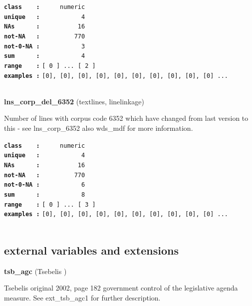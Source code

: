 \documentclass[]{article}
\begin{document}
\textbf{\texttt{class\ \ \ \ :}} \texttt{~~~~~numeric}\\
\textbf{\texttt{unique\ \ \ :}} \texttt{~~~~~~~~~~~4}\\
\textbf{\texttt{NAs\ \ \ \ \ \ :}} \texttt{~~~~~~~~~~16}\\
\textbf{\texttt{not-NA\ \ \ :}} \texttt{~~~~~~~~~770}\\
\textbf{\texttt{not-0-NA\ :}} \texttt{~~~~~~~~~~~3}\\
\textbf{\texttt{sum\ \ \ \ \ \ :}} \texttt{~~~~~~~~~~~4}\\
\textbf{\texttt{range\ \ \ \ :}}
\texttt{{[}\ 0\ {]}\ ...\ {[}\ 2\ {]}}\\
\textbf{\texttt{examples\ :}}
\texttt{{[}0{]},\ {[}0{]},\ {[}0{]},\ {[}0{]},\ {[}0{]},\ {[}0{]},\ {[}0{]},\ {[}0{]},\ {[}0{]},\ {[}0{]}\ ...}\\

~

\textbf{lns\_corp\_del\_6352} (textlines, linelinkage)

Number of lines with corpus code 6352 which have changed from last
version to this - see lns\_corp\_6352 also wds\_mdf for more
information.

\textbf{\texttt{class\ \ \ \ :}} \texttt{~~~~~numeric}\\
\textbf{\texttt{unique\ \ \ :}} \texttt{~~~~~~~~~~~4}\\
\textbf{\texttt{NAs\ \ \ \ \ \ :}} \texttt{~~~~~~~~~~16}\\
\textbf{\texttt{not-NA\ \ \ :}} \texttt{~~~~~~~~~770}\\
\textbf{\texttt{not-0-NA\ :}} \texttt{~~~~~~~~~~~6}\\
\textbf{\texttt{sum\ \ \ \ \ \ :}} \texttt{~~~~~~~~~~~8}\\
\textbf{\texttt{range\ \ \ \ :}}
\texttt{{[}\ 0\ {]}\ ...\ {[}\ 3\ {]}}\\
\textbf{\texttt{examples\ :}}
\texttt{{[}0{]},\ {[}0{]},\ {[}0{]},\ {[}0{]},\ {[}0{]},\ {[}0{]},\ {[}0{]},\ {[}0{]},\ {[}0{]},\ {[}0{]}\ ...}\\

~

\subsection{external variables and
extensions}\label{external-variables-and-extensions}

\textbf{tsb\_agc} (Tsebelis )

Tsebelis original 2002, page 182 government control of the legislative
agenda measure. See ext\_tsb\_agc1 for further description.
\end{document}
